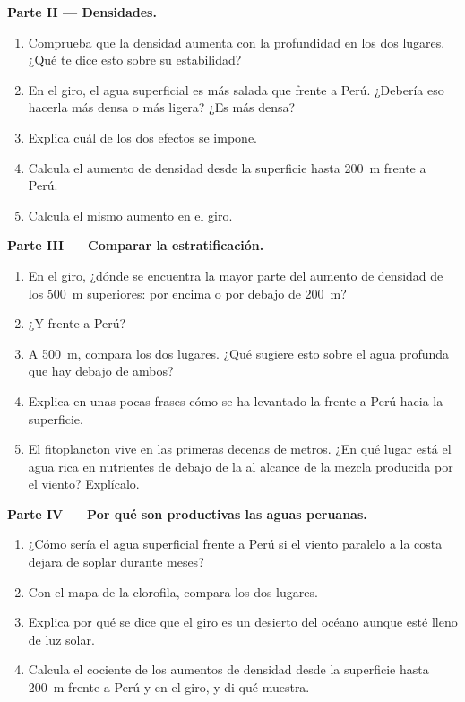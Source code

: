\begin{problem}
\medskip
\noindent\textbf{Parte II --- Densidades.}
\begin{enumerate}[resume]
  \item Comprueba que la densidad aumenta con la profundidad en los dos
        lugares. ¿Qué te dice esto sobre su estabilidad?
  \item En el giro, el agua superficial es más salada que frente a Perú.
        ¿Debería eso hacerla más densa o más ligera? ¿Es más densa?
  \item Explica cuál de los dos efectos se impone.
  \item Calcula el aumento de densidad desde la superficie hasta
        \qty{200}{m} frente a Perú.
  \item Calcula el mismo aumento en el giro.
\end{enumerate}

\medskip
\noindent\textbf{Parte III --- Comparar la estratificación.}
\begin{enumerate}[resume]
  \item En el giro, ¿dónde se encuentra la mayor parte del aumento de
        densidad de los \qty{500}{m} superiores: por encima o por debajo de
        \qty{200}{m}?
  \item ¿Y frente a Perú?
  \item A \qty{500}{m}, compara los dos lugares. ¿Qué sugiere esto sobre el
        agua profunda que hay debajo de ambos?
  \item Explica en unas pocas frases cómo se ha levantado la 
        frente a Perú hacia la superficie.
  \item El fitoplancton vive en las primeras decenas de metros. ¿En qué lugar
        está el agua rica en nutrientes de debajo de la  al alcance
        de la mezcla producida por el viento? Explícalo.
\end{enumerate}

\medskip
\noindent\textbf{Parte IV --- Por qué son productivas las aguas peruanas.}
\begin{enumerate}[resume]
  \item ¿Cómo sería el agua superficial frente a Perú si el viento paralelo
        a la costa dejara de soplar durante meses?
  \item Con el mapa de la clorofila, compara los dos lugares.
  \item Explica por qué se dice que el giro es un desierto del océano aunque
        esté lleno de luz solar.
  \item Calcula el cociente de los aumentos de densidad desde la superficie
        hasta \qty{200}{m} frente a Perú y en el giro, y di qué muestra.
\end{enumerate}
\end{problem}
